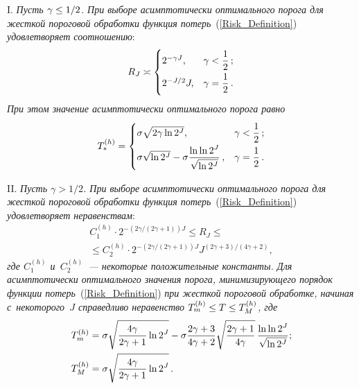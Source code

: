 \begin{multicols}{2}
I. \textit{Пусть $\gamma\hm\le1/2$. 
При выборе асимптотически оптимального порога для жест\-кой пороговой обработки функция 
потерь}~(\ref{Risk_Definition}) \textit{удовле\-тво\-ря\-ет соотношению}:
$$
R_J\asymp
\begin{cases}
2^{-\gamma J}, & \gamma<\displaystyle\frac{\displaystyle 1\mathstrut}{\displaystyle 2\mathstrut}\,;\\
2^{-J/2}J, & \gamma=\displaystyle\frac{\displaystyle 1\mathstrut}{\displaystyle 2\mathstrut}\,.
\end{cases}
$$
\textit{При этом значение асимп\-то\-ти\-че\-ски оптимального порога равно}
$$
T_*^{(h)}=
\begin{cases}
\sigma\sqrt{2\gamma\ln 2^J}, & \gamma<\displaystyle\frac{\displaystyle 1\mathstrut}{\displaystyle 2\mathstrut}\,;\\
\sigma\sqrt{\ln 2^J}-\sigma\displaystyle\frac{\displaystyle \ln\ln 2^J\mathstrut}{\displaystyle \sqrt{\ln 2^J}\mathstrut}\,, & \gamma=\displaystyle\frac{\displaystyle 1\mathstrut}{\displaystyle 2\mathstrut}\,.
\end{cases}
$$

II. \textit{Пусть $\gamma>1/2$. При выборе асимп\-то\-ти\-че\-ски оптимального порога для жест\-кой пороговой 
обработки функция потерь}~(\ref{Risk_Definition}) \textit{удовле\-тво\-ря\-ет неравенствам}:
\begin{multline*}
C_1^{(h)}\cdot 2^{-({2\gamma}/({2\gamma+1}))J}
\le R_J\le{}\\
{}\le  C_2^{(h)}\cdot 2^{-({2\gamma}/({2\gamma+1}))J} J^{(2\gamma+3)/(4\gamma+2)},
\end{multline*}
\textit{где $C_1^{(h)}$ и~$C_2^{(h)}$~--- некоторые положительные константы.
Для асимп\-то\-ти\-че\-ски оптимального значения порога, ми\-ни\-ми\-зи\-ру\-юще\-го порядок функции 
потерь}~(\ref{Risk_Definition}) 
\textit{при жест\-кой пороговой обработке, начиная с~некоторого~$J$ справедливо неравенство 
$T_m^{(h)}\le T\hm\le T_M^{(h)}$, где}
\begin{align*}
T_m^{(h)}&=\sigma\sqrt{\displaystyle\frac{\displaystyle 4\gamma\mathstrut}{\displaystyle 2\gamma+1\mathstrut}\ln 2^J}
-\sigma\displaystyle\frac{\displaystyle 2\gamma+3\mathstrut}{\displaystyle 4\gamma+2\mathstrut}
\sqrt{\displaystyle\frac{\displaystyle 2\gamma+1\mathstrut}{\displaystyle 4\gamma\mathstrut}}\,\displaystyle\frac{\displaystyle \ln\ln 2^J\mathstrut}{\displaystyle \sqrt{\ln 2^J}\mathstrut};
\\
T_M^{(h)}&=\sigma\sqrt{\displaystyle\frac{\displaystyle 4\gamma\mathstrut}{\displaystyle 2\gamma+1\mathstrut}\ln 2^J}\,.
\end{align*}


\end{multicols}
